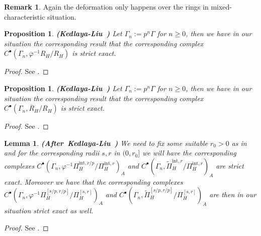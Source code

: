 \documentclass[12pt]{amsart}
\newtheorem{lemma}[theorem]{Lemma}
\newtheorem{proposition}[theorem]{Proposition}
\theoremstyle{definition}
\newtheorem{remark}[theorem]{Remark}
\numberwithin{equation}{section}
\begin{document}
\begin{remark}
Again the deformation only happens over the rings in mixed-characteristic situation.	
\end{remark}
	



\begin{proposition} \mbox{\bf{(Kedlaya-Liu \cite[Lemma 7.3.6]{KL16})}} \label{proposition4.8}
Let $\Gamma_n:=p^n\Gamma$ for $n\geq 0$, then we have in our situation the corresponding result that the corresponding complex $C^\bullet(\Gamma_n,\overline{\varphi}^{-1}R_H/R_H)$ is strict exact.
\end{proposition}

\begin{proof}
See \cite[Lemma 7.3.6]{KL16}.
\end{proof}


\begin{proposition} \mbox{\bf{(Kedlaya-Liu \cite[Lemma 5.6.4]{KL16})}} \label{proposition4.9}
Let $\Gamma_n:=p^n\Gamma$ for $n\geq 0$, then we have in our situation the corresponding result that the corresponding complex $C^\bullet(\Gamma_n,\overline{R}_H/R_H)$ is strict exact.
\end{proposition}

\begin{proof}
See \cite[Lemma 5.6.4]{KL16}. 
\end{proof}






\begin{lemma} \mbox{\bf{(After Kedlaya-Liu \cite[Corollary 5.6.5]{KL16})}} \label{lemma4.10}
We need to fix some suitable $r_0>0$ as in \cite[Corollary 5.6.5]{KL16} and for the corresponding radii $s,r$ in $(0,r_0]$ we will have the corresponding complexes $C^\bullet(\Gamma_n,\varphi^{-1}\Pi^{\mathrm{int},r/p}_{H}/\Pi^{\mathrm{int},r}_{H})_A$ and $C^\bullet(\Gamma_n,\widetilde{\Pi}^{\mathrm{int},r}_{H}/\Pi^{\mathrm{int},r}_{H})_A$ are strict exact. Moreover we have that the corresponding complexes $C^\bullet(\Gamma_n,\varphi^{-1}\Pi^{[s/p,r/p]}_{H}/\Pi^{[s,r]}_{H})_A$ and $C^\bullet(\Gamma_n,\widetilde{\Pi}^{[s/p,r/p]}_{H}/\Pi^{[s,r]}_{H})_A$ are then in our situation strict exact as well.  	
\end{lemma}




\begin{proof}
See \cite[Corollary 5.6.5]{KL16}.	
\end{proof}
\end{document}
